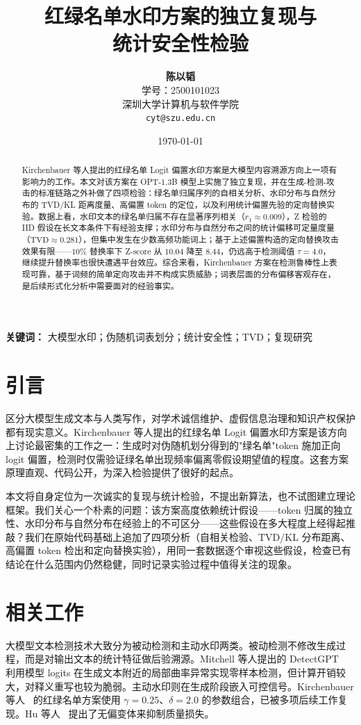 \documentclass[11pt,a4paper]{article}
\title{\LARGE \textbf{红绿名单水印方案的独立复现与\\统计安全性检验}}
\author{\textbf{陈以韬} \\ 学号：2500101023 \\ 深圳大学计算机与软件学院 \\ \texttt{cyt@szu.edu.cn}}
\date{\today}
\begin{document}
\maketitle

\begin{abstract}
Kirchenbauer 等人提出的红绿名单 Logit 偏置水印方案是大模型内容溯源方向上一项有影响力的工作。本文对该方案在 OPT-1.3B 模型上实施了独立复现，并在生成-检测-攻击的标准链路之外补做了四项检验：绿名单归属序列的自相关分析、水印分布与自然分布的 TVD/KL 距离度量、高偏置 token 的定位，以及利用统计偏置先验的定向替换实验。数据上看，水印文本的绿名单归属不存在显著序列相关（$r_1 \approx 0.009$），Z 检验的 IID 假设在长文本条件下有经验支撑；水印分布与自然分布之间的统计偏移可定量度量（$\text{TVD} \approx 0.281$），但集中发生在少数高频功能词上；基于上述偏置构造的定向替换攻击效果有限——$10\%$ 替换率下 Z-score 从 $10.04$ 降至 $8.44$，仍远高于检测阈值 $\tau=4.0$，继续提升替换率也很快遭遇平台效应。综合来看，Kirchenbauer 方案在检测鲁棒性上表现可靠，基于词频的简单定向攻击并不构成实质威胁；词表层面的分布偏移客观存在，是后续形式化分析中需要面对的经验事实。
\end{abstract}

\vspace{1em}
\textbf{关键词：} 大模型水印；伪随机词表划分；统计安全性；TVD；复现研究

\section{引言}
区分大模型生成文本与人类写作，对学术诚信维护、虚假信息治理和知识产权保护都有现实意义。Kirchenbauer 等人提出的红绿名单 Logit 偏置水印方案是该方向上讨论最密集的工作之一：生成时对伪随机划分得到的"绿名单"token 施加正向 logit 偏置，检测时仅需验证绿名单出现频率偏离零假设期望值的程度。这套方案原理直观、代码公开，为深入检验提供了很好的起点。

本文将自身定位为一次诚实的复现与统计检验，不提出新算法，也不试图建立理论框架。我们关心一个朴素的问题：该方案高度依赖统计假设——token 归属的独立性、水印分布与自然分布在经验上的不可区分——这些假设在多大程度上经得起推敲？我们在原始代码基础上追加了四项分析（自相关检验、TVD/KL 分布距离、高偏置 token 检出和定向替换实验），用同一套数据逐个审视这些假设，检查已有结论在什么范围内仍然稳健，同时记录实验过程中值得关注的现象。

\section{相关工作}
大模型文本检测技术大致分为被动检测和主动水印两类。被动检测不修改生成过程，而是对输出文本的统计特征做后验溯源。Mitchell 等人提出的 DetectGPT~\cite{mitchell2023detectgpt} 利用模型 logits 在生成文本附近的局部曲率异常实现零样本检测，但计算开销较大，对释义重写也较为脆弱。主动水印则在生成阶段嵌入可控信号。Kirchenbauer 等人~\cite{kirchenbauer2023watermark,kirchenbauer2023reliability} 的红绿名单方案使用 $\gamma=0.25$、$\delta=2.0$ 的参数组合，已被多项后续工作复现。Hu 等人~\cite{hu2023unbiased} 提出了无偏变体来抑制质量损失。
\end{document}
